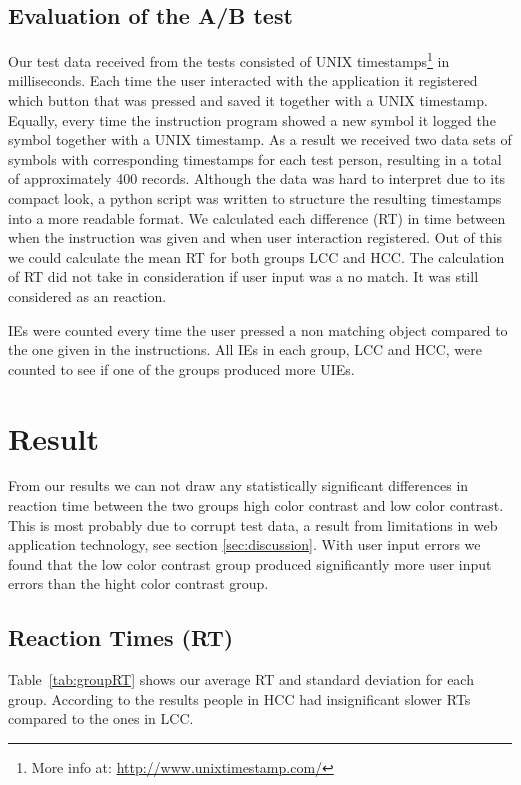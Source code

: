 \documentclass[runningheads,a4paper]{llncs}
\begin{document}
\subsection{Evaluation of the A/B test}
Our test data received from the tests consisted of UNIX timestamps\footnote{More info at: \url{http://www.unixtimestamp.com/}} in milliseconds. Each time the user interacted with the application it registered which button that was pressed and saved it together with a UNIX timestamp. Equally, every time the instruction program showed a new symbol it logged the symbol together with a UNIX timestamp. As a result we received two data sets of symbols with corresponding timestamps for each test person, resulting in a total of approximately 400 records. Although the data was hard to interpret due to its compact look, a python script was written to structure the resulting timestamps into a more readable format. We calculated each difference (RT) in time between when the instruction was given and when user interaction registered. Out of this we could calculate the mean RT for both groups LCC and HCC. The calculation of RT did not take in consideration if user input was a no match. It was still considered as an reaction.

IEs were counted every time the user pressed a non matching object compared to the one given in the instructions. All IEs in each group, LCC and HCC, were counted to see if one of the groups produced more UIEs.

\section{Result}
From our results we can not draw any statistically significant differences in reaction time between the two groups high color contrast and low color contrast. This is most probably due to corrupt test data, a result from limitations in web application technology, see section \ref{sec:discussion}. With user input errors we found that the low color contrast group produced significantly more user input errors than the hight color contrast group.

\subsection{Reaction Times (RT)}
Table~\ref{tab:groupRT} shows our average RT and standard deviation for each group. According to the results people in HCC had insignificant slower RTs compared to the ones in LCC.
\end{document}
